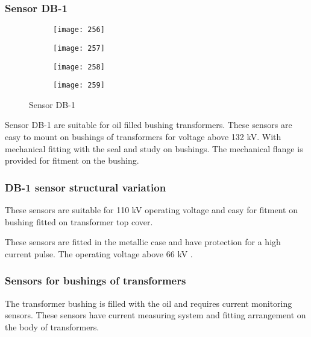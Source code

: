 \subsubsection{Sensor DB-1}
\begin{figure}[h!]
    \centering
    \begin{subfigure}[b]{0.49\textwidth}
        \centering
        \texttt{[image: 256]}
    \end{subfigure}
    \begin{subfigure}[b]{0.49\textwidth}
        \centering
        \texttt{[image: 257]}
    \end{subfigure}
    
    \vspace{3em}
    
    \begin{subfigure}[b]{0.49\textwidth}
        \centering
        \texttt{[image: 258]}
    \end{subfigure}
    \begin{subfigure}[b]{0.49\textwidth}
        \centering
        \texttt{[image: 259]}
    \end{subfigure}
    
    \caption{Sensor DB-1}
    \label{fig:Sensor DB-1}
\end{figure}

Sensor DB-1 are suitable for oil filled bushing transformers. These sensors are easy to mount on bushings of transformers for voltage above 132 kV. With mechanical fitting with the seal and study on bushings. The mechanical flange is provided for fitment on the bushing.

\subsubsection{DB-1 sensor structural variation}
These sensors are suitable for 110 kV operating voltage and easy for fitment on bushing fitted on transformer top cover.

These sensors are fitted in the metallic case and have protection for a high current pulse. The operating voltage above 66 kV \cite{gurin1993field}.

\subsubsection{Sensors for bushings of transformers}
The transformer bushing is filled with the oil and requires current monitoring sensors. These sensors have current measuring system and fitting arrangement on the body of transformers.

